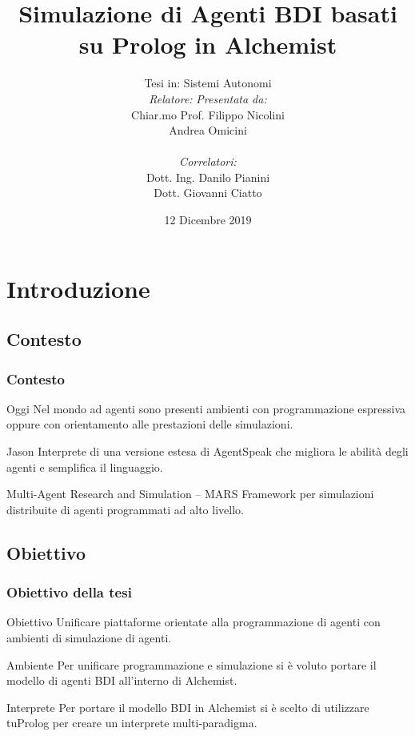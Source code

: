 \documentclass[handout]{beamer}\mode<presentation>{\usetheme{AMSCesenaBleu}}
\title[Prolog BDI agents on Alchemist]{Simulazione di Agenti BDI basati su Prolog in Alchemist}
\author[Filippo Nicolini]{Tesi in: Sistemi Autonomi\\
[0.5cm]
\textit{Relatore:} \hspace{6.55cm} \textit{Presentata da:}\\
Chiar.mo Prof. \hspace{5.5cm} Filippo Nicolini\\
Andrea Omicini \hspace{7.6cm} \phantom{g}\\
\textit{\\Correlatori:} \hspace{8.25cm} \phantom{g}\\
Dott. Ing. Danilo Pianini \hspace{6cm} \phantom{g}\\
Dott. Giovanni Ciatto \hspace{6.5cm} \phantom{g}\\
}
\institute[]{
\textsc{Alma Mater Studiorum} -- Università di Bologna \\
Campus di Cesena}
\date{12 Dicembre 2019}
\begin{document}
\maketitle


\section{Introduzione}

\subsection{Contesto}
\begin{frame}
\frametitle{Contesto}
\begin{block}{Oggi}
Nel mondo ad agenti sono presenti ambienti con programmazione espressiva oppure con orientamento alle prestazioni delle simulazioni.
\end{block}

\begin{block}{Jason}
Interprete di una versione estesa di AgentSpeak che migliora le abilità degli agenti e semplifica il linguaggio.
\end{block}

\begin{block}{Multi-Agent Research and Simulation -- MARS}
Framework per simulazioni distribuite di agenti programmati ad alto livello.
\end{block}
\end{frame}

\subsection{Obiettivo}
\begin{frame}
\frametitle{Obiettivo della tesi}
\begin{block}{Obiettivo}
\alert{Unificare} piattaforme orientate alla \alert{programmazione di agenti} con ambienti di \alert{simulazione di agenti}.
\end{block}

\begin{block}{Ambiente}
Per unificare programmazione e simulazione si è voluto portare il modello di agenti BDI all'interno di Alchemist.
\end{block}

\begin{block}{Interprete}
Per portare il modello BDI in Alchemist si è scelto di utilizzare tuProlog per creare un interprete multi-paradigma.
\end{block}
\end{frame}
\end{document}
